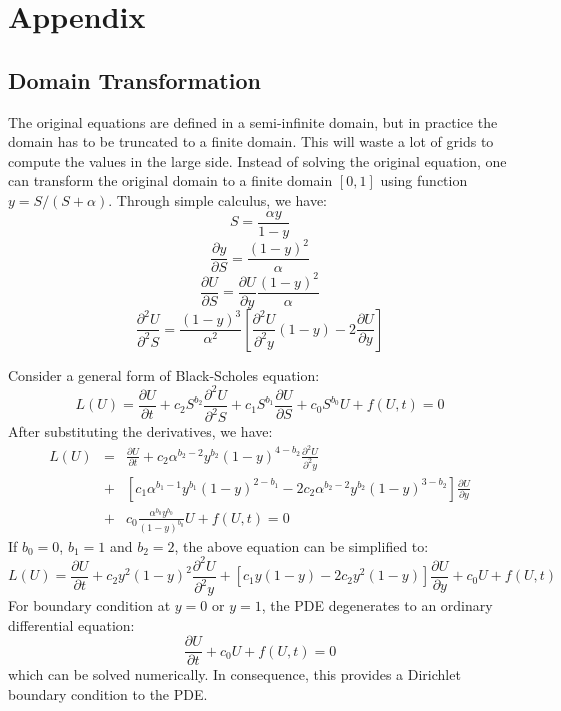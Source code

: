 \documentclass[12pt]{article}
\begin{document}
\section{Appendix}
\subsection{Domain Transformation}
The original equations are defined in a semi-infinite domain, but in practice the domain has to be truncated to a finite domain. This will waste a lot of grids to compute the values in the large side. Instead of solving the original equation, one can transform the original domain to a finite domain $[0, 1]$ using function $y = S/(S+\alpha)$. Through simple calculus, we have:
\begin{equation}
S = \frac{\alpha y}{1 - y}
\end{equation}
\begin{equation}
\frac{\partial y}{\partial S} = \frac{(1-y)^2}{\alpha}
\end{equation}
\begin{equation}
\frac{\partial U}{\partial S} = \frac{\partial U}{\partial y}\frac{(1-y)^2}{\alpha}
\end{equation}
\begin{equation}
\frac{\partial^2U}{\partial^2 S} = \frac{(1-y)^3}{\alpha^2}[\frac{\partial^2U}{\partial^2y}(1-y) - 2\frac{\partial U}{\partial y}]
\end{equation}

Consider a general form of Black-Scholes equation:
\begin{equation}
L(U) = \frac{\partial U}{\partial t} + c_2S^{b_2}\frac{\partial^2U}{\partial^2S} + c_1S^{b_1}\frac{\partial U}{\partial S} + c_0S^{b_0}U + f(U,t) = 0
\end{equation}
After substituting the derivatives, we have:
\begin{eqnarray}
L(U) &= &\frac{\partial U}{\partial t} + c_2\alpha^{b_2-2}y^{b_2}(1-y)^{4-b_2}\frac{\partial^2 U}{\partial^2 y} \\
&+& [c_1\alpha^{b_1-1}y^{b_1}(1-y)^{2-b_1} - 2c_2\alpha^{b_2-2}y^{b_2}(1-y)^{3-b_2}]\frac{\partial U}{\partial y} \\
&+& c_0\frac{\alpha^{b_0}y^{b_0}}{(1-y)^{b_0}}U + f(U,t) = 0
\end{eqnarray}
If $b_0 = 0$, $b_1 = 1$ and $b_2 = 2$, the above equation can be simplified to:
\begin{equation}
L(U) = \frac{\partial U}{\partial t} + c_2y^2(1-y)^2\frac{\partial^2U}{\partial^2y} + [c_1y(1-y) - 2c_2y^2(1-y)]\frac{\partial U}{\partial y} + c_0U + f(U, t)
\end{equation}
For boundary condition at $y = 0$ or $y = 1$, the PDE degenerates to an ordinary differential equation:
\begin{equation}
\frac{\partial U}{\partial t} + c_0U + f(U, t) = 0
\end{equation}
which can be solved numerically. In consequence, this provides a Dirichlet boundary condition to the PDE.
\end{document}
